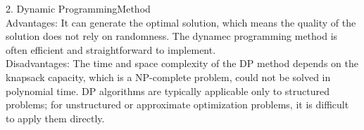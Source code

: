\begin{homeworkProblem}
2. Dynamic ProgrammingMethod \\
Advantages: It can generate the optimal solution, which means the quality of the solution does not rely on randomness. The dynamec programming method is often efficient and straightforward to implement. \\
Disadvantages: The time and space complexity of the DP method depends on the knapsack capacity, which is a NP-complete problem, could not be solved in polynomial time. DP algorithms are typically applicable only to structured problems; for unstructured or approximate optimization problems, it is difficult to apply them directly.

\end{homeworkProblem}

\newpage